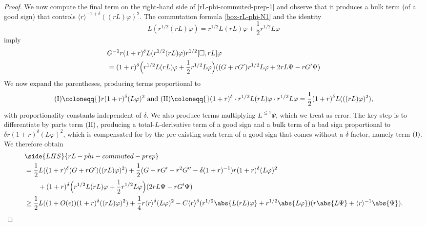\documentclass[10pt, reqno]{amsart}
\begin{document}
\begin{proof}
We now compute the final term on the right-hand side of \cref{rL-phi-commuted-prep-1}
and observe that it produces a bulk term (of a good sign) that controls
\(\langle{}r\rangle^{-1+\delta{}}((rL)\varphi{})^2\). The commutation formula \cref{box-rL-phi-N1} and the
identity
\begin{equation}\label{L-rL-phi-computation}
L(r^{1/2}(rL)\varphi{}) = r^{1/2}L(rL)\varphi{} + \frac{1}{2}r^{1/2}L\varphi{}
\end{equation}
imply
\begin{equation}\label{rL-phi-commuted-prep}
\begin{split}
&G^{-1}r(1+r)^\delta{}L(r^{1/2}(rL)\varphi{})r^{1/2}[\Box{},rL]\varphi{} \\
&= (1+r)^\delta{}\Bigl(r^{1/2}L(rL)\varphi{} + \frac{1}{2}r^{1/2}L\varphi{}\Bigr)((G + rG')r^{1/2}L\varphi{} + 2rL\Psi{} - rG'\Psi{}) \\
\end{split}
\end{equation}
We now expand the parentheses, producing terms proportional to
\begin{equation}
\textnormal{(I)}\coloneqq{}r(1+r)^\delta{}(L\varphi{})^2 \textnormal{ and } \textnormal{(II)}\coloneqq{}(1+r)^\delta{}\cdot r^{1/2}L(rL)\varphi{}\cdot r^{1/2}L\varphi{} = \frac{1}{2}(1+r)^\delta{}L(((rL)\varphi{})^2),
\end{equation}
with proportionality constants independent of \(\delta{}\). We also produce terms
multiplying \(L^{\le 1}\Psi{}\), which we treat as error. The key step is to
differentiate by parts term \(\textnormal{(II)}\),
producing a total-\(L\)-derivative term of a good sign and a bulk term of a bad
sign proportional to \(\delta{}r(1+r)^\delta{}(L\varphi{})^2\), which is
compensated for by the pre-existing such term of a good sign that comes without
a \(\delta{}\)-factor, namely term \(\textnormal{(I)}\). We therefore obtain
\begin{equation}
\begin{split}
&\side{LHS}{rL-phi-commuted-prep}\\
&= \frac{1}{2}L((1+r)^\delta{}(G+rG')((rL)\varphi{})^2) + \frac{1}{2}(G - rG' - r^2G'' - \delta{}(1+r)^{-1})r(1+r)^\delta{}(L\varphi{})^2 \\
&\qquad + (1+r)^\delta{}\Bigl(r^{1/2}L(rL)\varphi{} + \frac{1}{2}r^{1/2}L\varphi{}\Bigr)(2rL\Psi{} - rG'\Psi{}) \\
&\ge \frac{1}{2}L((1+O(\epsilon{}))(1+r)^\delta{}((rL)\varphi{})^2) + \frac{1}{4}r\langle{}r\rangle^\delta{}(L\varphi{})^2 - C\langle{}r\rangle{}^\delta{}(r^{1/2}\abs{L(rL)\varphi{}} + r^{1/2}\abs{L\varphi{}})(r\abs{L\Psi{}} + \langle{}r\rangle{}^{-1}\abs{\Psi{}}).

\end{split}
\end{equation}
\end{proof}
\end{document}
